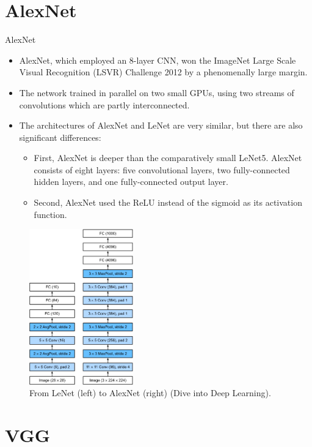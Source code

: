 \section{AlexNet}
\begin{vbframe}{AlexNet}
  \begin{itemize}
    \item AlexNet, which employed an 8-layer CNN, won the ImageNet Large Scale Visual Recognition (LSVR) Challenge 2012 by a phenomenally large margin.
    \item The network trained in parallel on two small GPUs, using two streams of convolutions which are partly interconnected.
    \item The architectures of AlexNet and LeNet are very similar, but there are also significant differences: 
       \begin{itemize}
          \item First, AlexNet is deeper than the comparatively small LeNet5. AlexNet consists of eight layers: five convolutional layers, two fully-connected hidden layers, and one fully-connected output layer. 
          \item Second, AlexNet used the ReLU instead of the sigmoid as its activation function. 
       \end{itemize}
  \end{itemize}
    \begin{figure}
        \centering
        \includegraphics[width=4.5cm]{plots/moderncnn/alexnet.png}
        \caption{From LeNet (left) to AlexNet (right) (Dive into Deep Learning).}
    \end{figure}
\end{vbframe}


\section{VGG}

